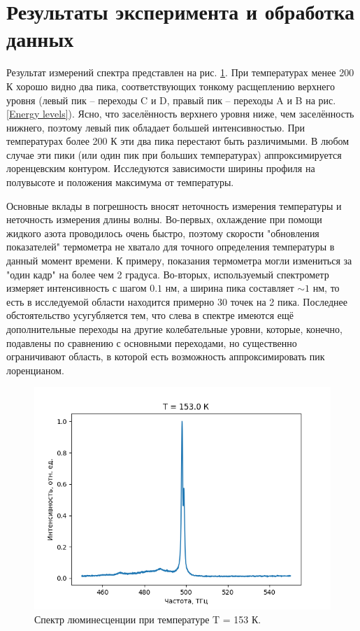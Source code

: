 \section{Результаты эксперимента и обработка данных}
Результат измерений спектра представлен на рис. \ref{spectre_general}. 
При температурах менее 200 К хорошо видно два пика, соответствующих тонкому 
расщеплению верхнего уровня (левый пик -- переходы C и D, правый пик -- переходы
A и B на рис. \ref{Energy levels}). Ясно, что заселённость верхнего уровня
ниже, чем заселённость нижнего, поэтому левый пик обладает большей интенсивностью.
При температурах более 200 К эти два пика перестают быть различимыми. В любом случае
эти пики (или один пик при больших температурах) аппроксимируется лоренцевским
контуром. Исследуются зависимости ширины профиля на полувысоте и положения максимума
от температуры.  

Основные вклады в погрешность вносят неточность измерения температуры и неточность
измерения длины волны. Во-первых, охлаждение при помощи жидкого азота проводилось
очень быстро, поэтому скорости "обновления показателей" термометра не хватало
для точного определения температуры в данный момент времени. К примеру, показания
термометра могли измениться за "один кадр" на более чем 2 градуса. Во-вторых,
используемый спектрометр измеряет интенсивность с шагом $0.1 \text{ нм}$, а ширина
пика составляет $\sim 1 \text{ нм}$, то есть в исследуемой области находится примерно
30 точек на 2 пика. Последнее обстоятельство усугубляется тем, что слева в спектре 
имеются ещё дополнительные переходы на другие колебательные уровни, которые, конечно,
подавлены по сравнению с основными переходами, но существенно ограничивают область,
в которой есть возможность аппроксимировать пик лоренцианом.  

\begin{figure}[!h]
    \begin{center}
        \includegraphics[width=0.7 \linewidth]{spectre_general.png}
        \caption{Спектр люминесценции при температуре T = 153 К.}
        \label{spectre_general}
    \end{center}
\end{figure}


